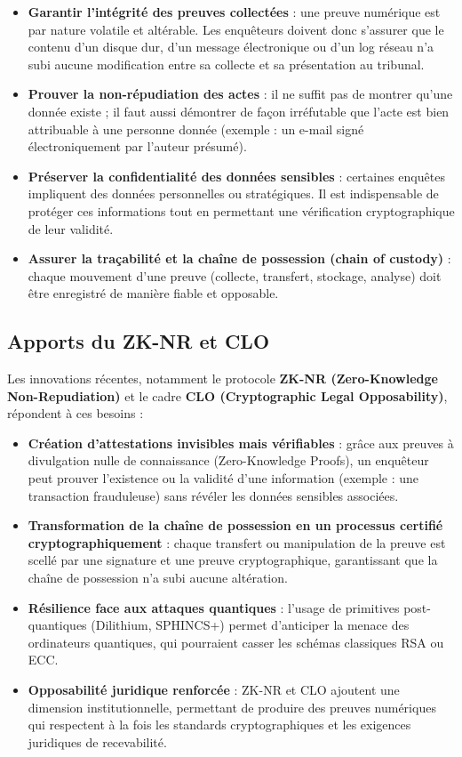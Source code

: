 \documentclass[11pt]{article}
\begin{document}
\begin{itemize}
    \item \textbf{Garantir l’intégrité des preuves collectées} : une preuve numérique est par nature volatile et altérable. Les enquêteurs doivent donc s’assurer que le contenu d’un disque dur, d’un message électronique ou d’un log réseau n’a subi aucune modification entre sa collecte et sa présentation au tribunal.
   \item \textbf{Prouver la non-répudiation des actes} : il ne suffit pas de montrer qu’une donnée existe ; il faut aussi démontrer de façon irréfutable que l’acte est bien attribuable à une personne donnée (exemple : un e-mail signé électroniquement par l’auteur présumé).
    \item \textbf{Préserver la confidentialité des données sensibles} : certaines enquêtes impliquent des données personnelles ou stratégiques. Il est indispensable de protéger ces informations tout en permettant une vérification cryptographique de leur validité.
    \item \textbf{Assurer la traçabilité et la chaîne de possession (chain of custody)} : chaque mouvement d’une preuve (collecte, transfert, stockage, analyse) doit être enregistré de manière fiable et opposable.
\end{itemize}

\subsection{Apports du ZK-NR et CLO}

Les innovations récentes, notamment le protocole \textbf{ZK-NR (Zero-Knowledge Non-Repudiation)} et le cadre \textbf{CLO (Cryptographic Legal Opposability)}, répondent à ces besoins :

\begin{itemize}
    \item \textbf{Création d’attestations invisibles mais vérifiables} : grâce aux preuves à divulgation nulle de connaissance (Zero-Knowledge Proofs), un enquêteur peut prouver l’existence ou la validité d’une information (exemple : une transaction frauduleuse) sans révéler les données sensibles associées.
    \item \textbf{Transformation de la chaîne de possession en un processus certifié cryptographiquement} : chaque transfert ou manipulation de la preuve est scellé par une signature et une preuve cryptographique, garantissant que la chaîne de possession n’a subi aucune altération.
    \item \textbf{Résilience face aux attaques quantiques} : l’usage de primitives post-quantiques (Dilithium, SPHINCS+) permet d’anticiper la menace des ordinateurs quantiques, qui pourraient casser les schémas classiques RSA ou ECC.
    \item \textbf{Opposabilité juridique renforcée} : ZK-NR et CLO ajoutent une dimension institutionnelle, permettant de produire des preuves numériques qui respectent à la fois les standards cryptographiques et les exigences juridiques de recevabilité.
\end{itemize}
\end{document}
